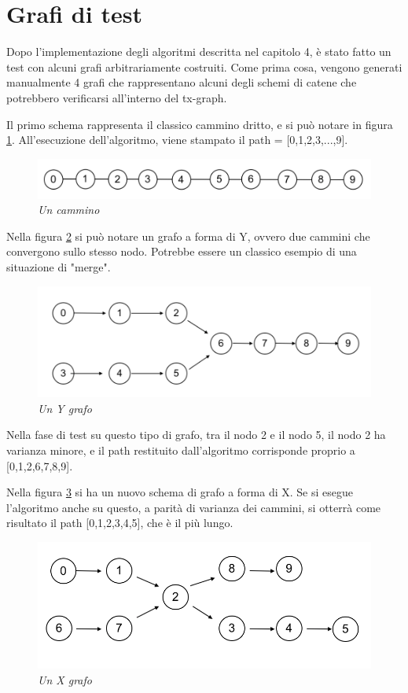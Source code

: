 \section{Grafi di test}
Dopo l'implementazione degli algoritmi descritta nel capitolo 4, è stato fatto un test con alcuni grafi arbitrariamente costruiti. Come prima cosa, vengono generati manualmente 4 grafi che rappresentano alcuni degli schemi di catene che potrebbero verificarsi all'interno del tx-graph.

Il primo schema rappresenta il classico cammino dritto, e si può notare in figura \ref{fig:straightgraph}. All'esecuzione dell'algoritmo, viene stampato il path = [0,1,2,3,...,9].
\begin{figure}[htbp]
	\centering
	\includegraphics[width = \linewidth]{figure/straightgraph}
	\caption{\textit{Un cammino}\label{fig:straightgraph}}
\end{figure}
Nella figura \ref{fig:ygraph} si può notare un grafo a forma di Y, ovvero due cammini che convergono sullo stesso nodo. Potrebbe essere un classico esempio di una situazione di "merge".
\begin{figure}[htbp]
	\centering
	\includegraphics[width = \linewidth]{figure/ygraph}
	\caption{\textit{Un Y grafo}\label{fig:ygraph}}
\end{figure}
Nella fase di test su questo tipo di grafo, tra il nodo 2 e il nodo 5, il nodo 2 ha varianza minore, e il path restituito dall'algoritmo corrisponde proprio a [0,1,2,6,7,8,9].

Nella figura \ref{fig:xgraph} si ha un nuovo schema di grafo a forma di X. Se si esegue l'algoritmo anche su questo, a parità di varianza dei cammini, si otterrà come risultato il path [0,1,2,3,4,5], che è il più lungo.
\begin{figure}[htbp]
	\centering
	\includegraphics[width = 0.8\linewidth]{figure/xgraph}
	\caption{\textit{Un X grafo}\label{fig:xgraph}}
\end{figure}

